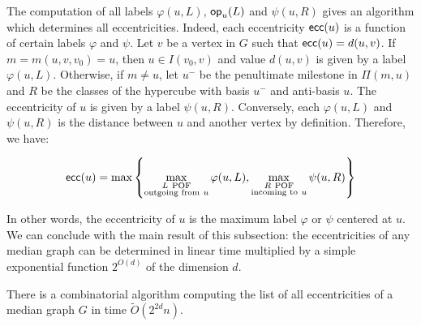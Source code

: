 \documentclass[a4paper,UKenglish,numberwithinsect,cleveref, autoref]{lipics-v2021}
\newcommand{\set}[1]{\left\{ #1 \right\}}
\newcommand{\ecc}{\mbox{\textsf{ecc}}}
\newcommand{\opp}{\mbox{\textsf{op}}}
\begin{document}
 The computation of all labels $\varphi(u,L)$, $\opp_u(L)$ and $\psi(u,R)$ gives an algorithm which determines all eccentricities. Indeed, each eccentricity $\ecc(u)$ is a function of certain labels $\varphi$ and $\psi$. Let $v$ be a vertex in $G$ such that $\ecc(u) = d(u,v)$. If $m = m(u,v,v_0) = u$, then $u \in I(v_0,v)$ and value $d(u,v)$ is given by a label $\varphi(u,L)$. Otherwise, if $m \neq u$, let $u^-$ be the penultimate milestone in $\Pi(m,u)$ and $R$ be the classes of the hypercube with basis $u^-$ and anti-basis $u$. The eccentricity of $u$ is given by a label $\psi(u,R)$. Conversely, each $\varphi(u,L)$ and $\psi(u,R)$ is the distance between $u$ and another vertex by definition. Therefore, we have:

\begin{equation}
\ecc(u) = \mbox{max}\set{\max\limits_{\substack{L ~\mbox{\scriptsize{POF}} \\ \mbox{\scriptsize{outgoing from}}~ u}} \varphi(u,L), \max\limits_{\substack{R ~\mbox{\scriptsize{POF}} \\ \mbox{\scriptsize{incoming to}}~ u}} \psi(u,R)}
\label{eq:ecc_labels}
\end{equation}

In other words, the eccentricity of $u$ is the maximum label $\varphi$ or $\psi$ centered at $u$. We can conclude with the main result of this subsection: the eccentricities of any median graph can be determined in linear time multiplied by a simple exponential function $2^{O(d)}$ of the dimension $d$.

\begin{theorem}
There is a combinatorial algorithm computing the list of all eccentricities of a median graph $G$ in time $\tilde{O}(2^{2d}n)$.
\label{th:simple_ecc}
\end{theorem}
\end{document}
